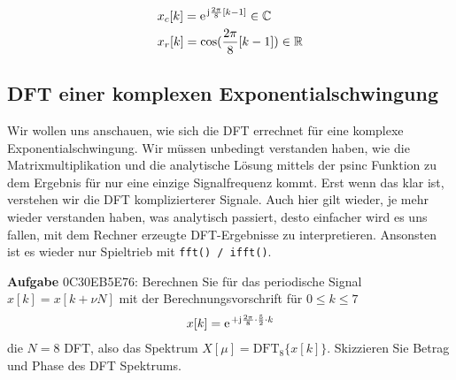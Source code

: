 \begin{Loesung}
\begin{align}
&x_c[k] = \e^{\im \frac{2\pi}{8} [k -1] } \in\mathbb{C}\\
&x_r[k] = \cos(\frac{2\pi}{8} [k-1]) \in\mathbb{R}
\end{align}
\end{Loesung}




















\newpage
\subsection{DFT einer komplexen Exponentialschwingung}
\label{sec:0C30EB5E76}
\begin{Ziel}
Wir wollen uns anschauen, wie sich die DFT errechnet für eine komplexe
Exponentialschwingung. Wir müssen unbedingt verstanden haben, wie die
Matrixmultiplikation und die analytische Lösung mittels der psinc Funktion
zu dem Ergebnis für nur eine einzige Signalfrequenz kommt. Erst wenn das
klar ist, verstehen wir die DFT komplizierterer Signale. Auch hier gilt
wieder, je mehr wieder verstanden haben, was analytisch passiert, desto einfacher
wird es uns fallen, mit dem Rechner erzeugte DFT-Ergebnisse zu interpretieren.
Ansonsten ist es wieder nur Spieltrieb mit \texttt{fft() / ifft()}.
\end{Ziel}
\textbf{Aufgabe} {\tiny 0C30EB5E76}: Berechnen Sie für das periodische
Signal $x[k]=x[k+\nu N]$
mit der Berechnungsvorschrift für $0\leq k \leq 7$
\begin{align}
x[k] = \e^{+\im \frac{2\pi}{8} \cdot \frac{5}{2} \cdot k}
\end{align}
die $N=8$ DFT, also das Spektrum $X[\mu] = \mathrm{DFT}_8\{x[k]\}$.
%
Skizzieren Sie Betrag und Phase des DFT Spektrums.


